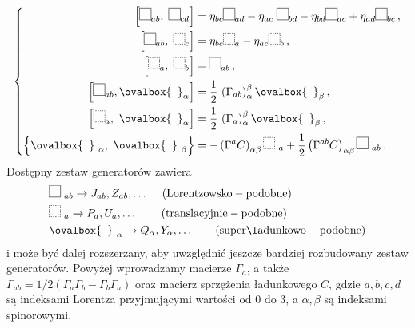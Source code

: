 \documentclass[12pt,a4paper]{article}
\begin{document}
\begin{align}\label{empty}
	\left\{
	\begin{aligned} 
		\left[ \framebox(10,10){~~}_{ab},\ \framebox(10,10){~~}_{cd}\right] & =\eta_{bc} \framebox(10,10){~~}_{ad}-\eta_{ac}\ \framebox(10,10){~~}_{bd}-\eta_{bd} \framebox(10,10){~~}_{ac}+\eta_{ad} \framebox(10,10){~~}_{bc}\, ,\\
		\left[\framebox(10,10){~~}_{ab},\ \dashbox(10,10){~~}_{c}\right] & =\eta_{bc} \dashbox(10,10){~~}_{a}-\eta_{ac} \dashbox(10,10){~~}_{b}\, , \\
		\left[\dashbox(10,10){~~}_{a},\ \dashbox(10,10){~~}_{b}\right] & =\framebox(10,10){~~}_{ab}\, ,\\
		\left[ \framebox(10,10){~~}_{ab},\ovalbox{\phantom{I}}_{\alpha }\right]
		&=\frac{1}{2}\,\left( \Gamma _{ab}\right) _{\alpha }^{\beta }\ovalbox{\phantom{I}}_{\beta}\,,\\ 
		\left[ \dashbox(10,10){~~}_{a},\ \ovalbox{\phantom{I}}_{\alpha }\right]&=\frac{1}{2}\,\left( \Gamma _{a}\right) _{\alpha }^{\beta }\ovalbox{\phantom{I}}_{\beta}\,, \\ 
		\left\{ \ovalbox{\phantom{I}}_{~\alpha },\ \ovalbox{\phantom{I}}_{~\beta }\right\} &=-\left(	\Gamma ^{a} C\right) _{\alpha \beta } \dashbox(10,10){~~}_{~a}+\frac{1}{2}\left(\Gamma ^{ab} C\right) _{\alpha \beta } \framebox(10,10){~~}_{~ab}\,.
	\end{aligned} 
	\right.
\end{align}
Dostępny zestaw generatorów zawiera
\begin{align}
	& \framebox(10,10){~~}_{~ab} \to J_{ab}, Z_{ab}, \ldots \quad\; (\rm{Lorentzowsko-podobne})\notag\\
	& \dashbox(10,10){~~}_{~a}\to P_{a}, U_{a}, \ldots \quad\quad\, (\rm{translacyjnie-podobne})\\
	& \ovalbox{\phantom{I}}_{~\alpha } \to Q_\alpha, Y_\alpha, \dots \quad\quad (\rm{superładunkowo-podobne})\notag
\end{align}
i może być dalej rozszerzany, aby uwzględnić jeszcze bardziej rozbudowany zestaw generatorów. Powyżej wprowadzamy macierze $\Gamma_a$, a także $\Gamma_{ab}=1/2(\Gamma_a \Gamma_b-\Gamma_b \Gamma_a)$ oraz macierz sprzężenia ładunkowego $C$, gdzie $a,b,c,d$ są indeksami Lorentza przyjmującymi wartości od $0$ do $3$, a $\alpha,\beta$ są indeksami spinorowymi.
\end{document}
